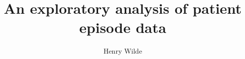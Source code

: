 \documentclass{beamer}
\title{An exploratory analysis of patient episode data}
\author{Henry Wilde}
\institute{Cardiff University School of Mathematics}
\begin{document}
\begin{frame}
\titlepage%
\end{frame}



\graphicspath{{../img/general/}}


\graphicspath{{../img/diabetes/}}



\end{document}
